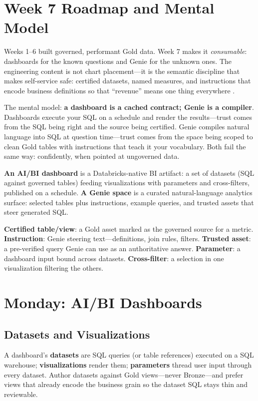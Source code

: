 \section{Week 7 Roadmap and Mental Model}
Weeks 1--6 built governed, performant Gold data. Week 7 makes it \emph{consumable}: dashboards for the known questions and Genie for the unknown ones. The engineering content is not chart placement---it is the semantic discipline that makes self-service safe: certified datasets, named measures, and instructions that encode business definitions so that ``revenue'' means one thing everywhere \cite{databricksDashboards,databricksGenie}.

The mental model: \textbf{a dashboard is a cached contract; Genie is a compiler}. Dashboards execute your SQL on a schedule and render the results---trust comes from the SQL being right and the source being certified. Genie compiles natural language into SQL at question time---trust comes from the space being scoped to clean Gold tables with instructions that teach it your vocabulary. Both fail the same way: confidently, when pointed at ungoverned data.

\begin{definitionbox}
\textbf{An AI/BI dashboard} is a Databricks-native BI artifact: a set of datasets (SQL against governed tables) feeding visualizations with parameters and cross-filters, published on a schedule. \textbf{A Genie space} is a curated natural-language analytics surface: selected tables plus instructions, example queries, and trusted assets that steer generated SQL.
\end{definitionbox}

\begin{keyterms}
\textbf{Certified table/view}: a Gold asset marked as the governed source for a metric. \textbf{Instruction}: Genie steering text---definitions, join rules, filters. \textbf{Trusted asset}: a pre-verified query Genie can use as an authoritative answer. \textbf{Parameter}: a dashboard input bound across datasets. \textbf{Cross-filter}: a selection in one visualization filtering the others.
\end{keyterms}

\section{Monday: AI/BI Dashboards}
\subsection{Datasets and Visualizations}
A dashboard's \textbf{datasets} are SQL queries (or table references) executed on a SQL warehouse; \textbf{visualizations} render them; \textbf{parameters} thread user input through every dataset. Author datasets against Gold views---never Bronze---and prefer views that already encode the business grain so the dataset SQL stays thin and reviewable.


